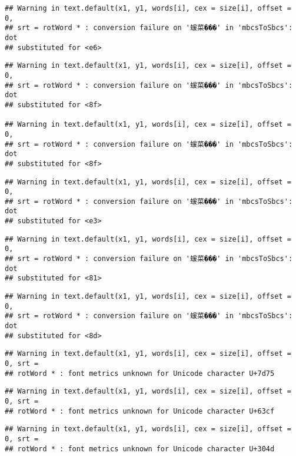 \documentclass[]{article}
\begin{document}
\begin{verbatim}
## Warning in text.default(x1, y1, words[i], cex = size[i], offset = 0,
## srt = rotWord * : conversion failure on '蝯菜���' in 'mbcsToSbcs': dot
## substituted for <e6>
\end{verbatim}

\begin{verbatim}
## Warning in text.default(x1, y1, words[i], cex = size[i], offset = 0,
## srt = rotWord * : conversion failure on '蝯菜���' in 'mbcsToSbcs': dot
## substituted for <8f>

## Warning in text.default(x1, y1, words[i], cex = size[i], offset = 0,
## srt = rotWord * : conversion failure on '蝯菜���' in 'mbcsToSbcs': dot
## substituted for <8f>
\end{verbatim}

\begin{verbatim}
## Warning in text.default(x1, y1, words[i], cex = size[i], offset = 0,
## srt = rotWord * : conversion failure on '蝯菜���' in 'mbcsToSbcs': dot
## substituted for <e3>
\end{verbatim}

\begin{verbatim}
## Warning in text.default(x1, y1, words[i], cex = size[i], offset = 0,
## srt = rotWord * : conversion failure on '蝯菜���' in 'mbcsToSbcs': dot
## substituted for <81>
\end{verbatim}

\begin{verbatim}
## Warning in text.default(x1, y1, words[i], cex = size[i], offset = 0,
## srt = rotWord * : conversion failure on '蝯菜���' in 'mbcsToSbcs': dot
## substituted for <8d>
\end{verbatim}

\begin{verbatim}
## Warning in text.default(x1, y1, words[i], cex = size[i], offset = 0, srt =
## rotWord * : font metrics unknown for Unicode character U+7d75
\end{verbatim}

\begin{verbatim}
## Warning in text.default(x1, y1, words[i], cex = size[i], offset = 0, srt =
## rotWord * : font metrics unknown for Unicode character U+63cf
\end{verbatim}

\begin{verbatim}
## Warning in text.default(x1, y1, words[i], cex = size[i], offset = 0, srt =
## rotWord * : font metrics unknown for Unicode character U+304d
\end{verbatim}
\end{document}
